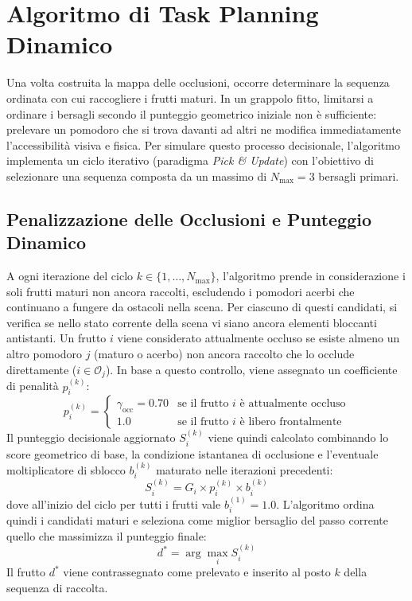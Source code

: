 \section{Algoritmo di Task Planning Dinamico}
\label{sec:planning_dinamico}

Una volta costruita la mappa delle occlusioni, occorre determinare la sequenza ordinata con cui raccogliere i frutti maturi. In un grappolo fitto, limitarsi a ordinare i bersagli secondo il punteggio geometrico iniziale non è sufficiente: prelevare un pomodoro che si trova davanti ad altri ne modifica immediatamente l'accessibilità visiva e fisica.
Per simulare questo processo decisionale, l'algoritmo implementa un ciclo iterativo (paradigma \textit{Pick \& Update}) con l'obiettivo di selezionare una sequenza composta da un massimo di $N_{\max} = 3$ bersagli primari.

\subsection{Penalizzazione delle Occlusioni e Punteggio Dinamico}
\label{subsec:punteggio_dinamico}

A ogni iterazione del ciclo $k \in \{1, \dots, N_{\max}\}$, l'algoritmo prende in considerazione i soli frutti maturi non ancora raccolti, escludendo i pomodori acerbi che continuano a fungere da ostacoli nella scena.
Per ciascuno di questi candidati, si verifica se nello stato corrente della scena vi siano ancora elementi bloccanti antistanti. Un frutto $i$ viene considerato attualmente occluso se esiste almeno un altro pomodoro $j$ (maturo o acerbo) non ancora raccolto che lo occlude direttamente ($i \in \mathcal{O}_j$). In base a questo controllo, viene assegnato un coefficiente di penalità $p_i^{(k)}$:
\begin{equation}
    p_i^{(k)} = 
    \begin{cases}
        \gamma_{\text{occ}} = 0.70 & \text{se il frutto } i \text{ è attualmente occluso} \\[6pt]
        1.0 & \text{se il frutto } i \text{ è libero frontalmente}
    \end{cases}
    \label{eq:penalita_occlusione}
\end{equation}
Il punteggio decisionale aggiornato $S_i^{(k)}$ viene quindi calcolato combinando lo score geometrico di base, la condizione istantanea di occlusione e l'eventuale moltiplicatore di sblocco $b_i^{(k)}$ maturato nelle iterazioni precedenti:
\begin{equation}
    S_i^{(k)} = G_i \times p_i^{(k)} \times b_i^{(k)}
    \label{eq:score_dinamico}
\end{equation}
dove all'inizio del ciclo per tutti i frutti vale $b_i^{(1)} = 1.0$. L'algoritmo ordina quindi i candidati maturi e seleziona come miglior bersaglio del passo corrente quello che massimizza il punteggio finale:
\begin{equation}
    d^* = \arg\max_i S_i^{(k)}
    \label{eq:selezione_best}
\end{equation}
Il frutto $d^*$ viene contrassegnato come prelevato e inserito al posto $k$ della sequenza di raccolta.

